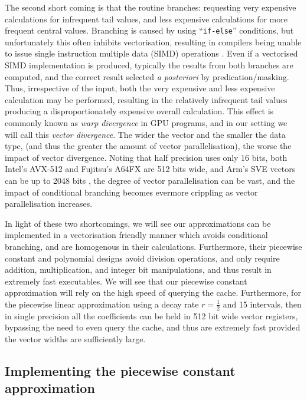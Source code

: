 \documentclass[manuscript,review]{acmart}
\begin{document}
The second short coming is that the routine branches: requesting very expensive calculations for infrequent tail values, and less expensive calculations for more frequent central values. Branching is caused by using ``\texttt{if-else}'' conditions, but unfortunately this often inhibits vectorisation, resulting in compilers being unable to issue single instruction multiple data (SIMD) operations \citep{vanderpas2017using}. Even if a vectorised SIMD implementation is produced, typically the results from both branches are computed, and the correct result selected \textit{a posteriori} by predication/masking. Thus, irrespective of the input, both the very expensive and less expensive calculation may be performed, resulting in the relatively infrequent tail values producing a disproportionately expensive overall calculation. This effect is commonly known as \emph{warp divergence} in GPU programs, and in our setting we will call this \emph{vector divergence}. The wider the vector and the smaller the data type, (and thus the greater the amount of vector parallelisation), the worse the impact of vector divergence. Noting that half precision uses only 16 bits, both Intel's AVX-512 and Fujitsu's A64FX are 512 bits wide, and Arm's SVE vectors can be up to 2048 bits \citep{petrogalli2016sneak_peak,stephens2017arm}, the degree of vector parallelisation can be vast, and the impact of conditional branching becomes evermore crippling as vector parallelisation increases. 

In light of these two shortcomings, we will see our approximations can be implemented in a vectorisation friendly manner which avoids conditional branching, and are homogenous in their calculations. Furthermore, their piecewise constant and polynomial designs avoid division operations, and only require addition, multiplication, and integer bit manipulations, and thus result in extremely fast executables. We will see that our piecewise constant approximation will rely on the high speed of querying the cache. Furthermore, for the piecewise linear approximation using a decay rate $ r = \tfrac{1}{2} $ and 15 intervals, then in single precision all the coefficients can be held in 512 bit wide vector registers, bypassing the need to even query the cache, and thus are extremely fast provided the vector widths are sufficiently large. 

\subsection{Implementing the piecewise constant approximation}
\end{document}
